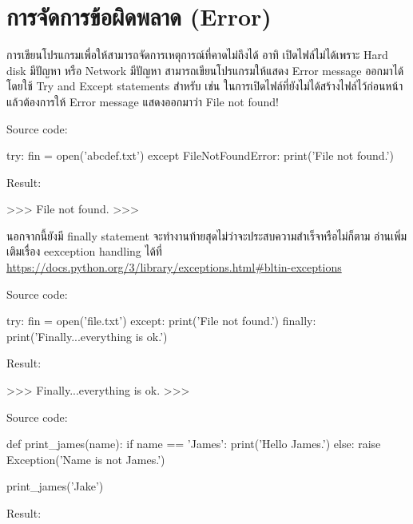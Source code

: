 \section{การจัดการข้อผิดพลาด (Error)}

การเขียนโปรแกรมเพื่อให้สามารถจัดการเหตุการณ์ที่คาดไม่ถึงได้ อาทิ เปิดไฟล์ไม่ได้เพราะ Hard disk มีปัญหา หรือ Network มีปัญหา สามารถเขียนโปรแกรมให้แสดง Error message ออกมาได้ โดยใช้ Try and Except statements สำหรับ  เช่น ในการเปิดไฟล์ที่ยังไม่ได้สร้างไฟล์ไว้ก่อนหน้า แล้วต้องการให้ Error message แสดงออกมาว่า  File not found!

Source code:
\begin{codelist}{}{}
try:
    fin = open('abcdef.txt')
except FileNotFoundError:
    print('File not found.')
\end{codelist}

Result:
\begin{codelist}{}{}
>>>
File not found.
>>>
\end{codelist}

นอกจากนี้ยังมี finally statement จะทำงานท้ายสุดไม่ว่าจะประสบความสำเร็จหรือไม่ก็ตาม อ่านเพิ่มเติมเรื่อง eexception handling ได้ที่ \url{https://docs.python.org/3/library/exceptions.html\#bltin-exceptions}

Source code:
\begin{codelist}{}{}
try:
    fin = open('file.txt')
except:
    print('File not found.')
finally:
    print('Finally...everything is ok.')
\end{codelist}

Result:
\begin{codelist}{}{}
>>>
Finally...everything is ok.
>>>
\end{codelist}

Source code:
\begin{codelist}{}{}
def print_james(name):
    if name == 'James':
        print('Hello James.')
    else:
        raise Exception('Name is not James.')

print_james('Jake')
\end{codelist}

Result:
\begin{codelist}{}{}

\end{codelist}



